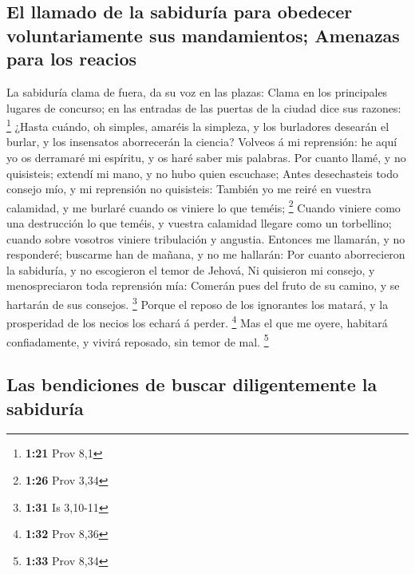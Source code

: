 \hypertarget{el-llamado-de-la-sabiduruxeda-para-obedecer-voluntariamente-sus-mandamientos-amenazas-para-los-reacios}{%
\subsection{El llamado de la sabiduría para obedecer voluntariamente sus
mandamientos; Amenazas para los
reacios}\label{el-llamado-de-la-sabiduruxeda-para-obedecer-voluntariamente-sus-mandamientos-amenazas-para-los-reacios}}

 La sabiduría clama de fuera, da su voz en las plazas:
 Clama en los principales lugares de concurso; en las
entradas de las puertas de la ciudad dice sus razones: \footnote{\textbf{1:21}
  Prov 8,1}  ¿Hasta cuándo, oh simples, amaréis la
simpleza, y los burladores desearán el burlar, y los insensatos
aborrecerán la ciencia?  Volveos á mi reprensión: he aquí
yo os derramaré mi espíritu, y os haré saber mis palabras. 
Por cuanto llamé, y no quisisteis; extendí mi mano, y no hubo quien
escuchase;  Antes desechasteis todo consejo mío, y mi
reprensión no quisisteis:  También yo me reiré en vuestra
calamidad, y me burlaré cuando os viniere lo que teméis; \footnote{\textbf{1:26}
  Prov 3,34}  Cuando viniere como una destrucción lo que
teméis, y vuestra calamidad llegare como un torbellino; cuando sobre
vosotros viniere tribulación y angustia.  Entonces me
llamarán, y no responderé; buscarme han de mañana, y no me hallarán:
 Por cuanto aborrecieron la sabiduría, y no escogieron el
temor de Jehová,  Ni quisieron mi consejo, y menospreciaron
toda reprensión mía:  Comerán pues del fruto de su camino,
y se hartarán de sus consejos. \footnote{\textbf{1:31} Is 3,10-11}
 Porque el reposo de los ignorantes los matará, y la
prosperidad de los necios los echará á perder. \footnote{\textbf{1:32}
  Prov 8,36}  Mas el que me oyere, habitará confiadamente,
y vivirá reposado, sin temor de mal. \footnote{\textbf{1:33} Prov 8,34}

\hypertarget{las-bendiciones-de-buscar-diligentemente-la-sabiduruxeda}{%
\subsection{Las bendiciones de buscar diligentemente la
sabiduría}\label{las-bendiciones-de-buscar-diligentemente-la-sabiduruxeda}}

